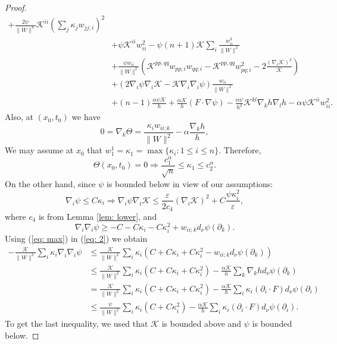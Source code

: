 \documentclass{amsart}
\theoremstyle{definition}
\theoremstyle{remark}
\numberwithin{equation}{section}
\begin{document}
\begin{proof}
\begin{align*}
+\frac{2\psi}{\|W\|^4}\mathcal{K}^{ii}\left(\sum_j\kappa_jw_{jj;i}\right)^2\\
&+\psi\mathcal{K}^{ii}w_{ii}^2-\psi(n+1)\mathcal{K}\sum_i\frac{w_{ii}^3}{\|W\|^2}\\
&+\frac{\psi w_{ii}}{\|W\|^2}\left(\mathcal{K}^{pp,qq}w_{pp;i}w_{qq;i}-\mathcal{K}^{pp,qq}w_{pq;i}^2
-2\frac{(\nabla_i\mathcal{K})^2}{\mathcal{K}}\right)\\
&+(2\nabla_i\psi\nabla_i\mathcal{K}-\mathcal{K}\nabla_i\nabla_i\psi)\frac{w_{ii}}{\|W\|^2}\\
&+(n-1)\frac{\alpha\psi\mathcal{K}}{h}+\frac{\alpha\mathcal{K}}{h}(F\cdot\nabla\psi)-\frac{\alpha\psi}{h^2}\mathcal{K}^{kl}\nabla_kh\nabla_lh
-\alpha\psi\mathcal{K}^{ii}w_{ii}^2.
\end{align*}
Also, at $(x_0,t_0)$ we have
\begin{equation}\label{eq: max}
0=\nabla_k\Theta=\frac{\kappa_iw_{ii;k}}{\|W\|^2}-\alpha\frac{\nabla_k h}{h},
\end{equation}
We may assume at $x_0$ that $w_1^1=\kappa_1=\max\{\kappa_i:1\leq i\leq n\}.$ Therefore,
\begin{equation}\label{eq: max1}
\Theta(x_0,t_0)=0\Rightarrow\frac{c_1^{\alpha}}{\sqrt{n}}\leq \kappa_1\leq c_2^{\alpha}.
\end{equation}
On the other hand, since $\psi$ is bounded below in view of our assumptions:
\begin{equation}\label{eq: 1}
\nabla_i\psi\leq C\kappa_i\Rightarrow \nabla_i\psi\nabla_i\mathcal{K}\leq \frac{\varepsilon}{2c_4} (\nabla_i\mathcal{K})^2+C\frac{\psi\kappa_i^2}{\varepsilon},
\end{equation}
where $c_4$ is from Lemma \ref{lem: lower},
and
\begin{equation}\label{eq: 2}
\nabla_i\nabla_i\psi\geq -C-C\kappa_i-C\kappa_i^2+w_{ii;k}d_{\nu}\psi(\partial_k).
\end{equation}
Using (\ref{eq: max}) in (\ref{eq: 2}) we obtain
\begin{align}\label{eq: 3}
-\frac{\mathcal{K}}{\|W\|^2}\sum_i\kappa_i\nabla_i\nabla_i\psi&\leq \frac{\mathcal{K}}{\|W\|^2}\sum_i \kappa_i(C+C\kappa_i+C\kappa_i^2-w_{ii;k}d_{\nu}\psi(\partial_k))\nonumber\\
&\leq \frac{\mathcal{K}}{\|W\|^2}\sum_i \kappa_i(C+C\kappa_i+C\kappa_i^2)-\frac{\alpha\mathcal{K}}{h}\sum_k \nabla_k hd_{\nu}\psi(\partial_k)\nonumber\\
&=\frac{\mathcal{K}}{\|W\|^2}\sum_i \kappa_i(C+C\kappa_i+C\kappa_i^2)-\frac{\alpha\mathcal{K}}{h}\sum_i \kappa_i(\partial_i\cdot F) d_{\nu}\psi(\partial_i)\nonumber\\
&\leq \frac{\psi}{\|W\|^2}\sum_i \kappa_i(C+C\kappa_i^2)-\frac{\alpha\mathcal{K}}{h}\sum_i \kappa_i(\partial_i\cdot F) d_{\nu}\psi(\partial_i).
\end{align}
To get the last inequality, we used that $\mathcal{K}$ is bounded above and $\psi$ is bounded below.



\end{proof}
\end{document}
